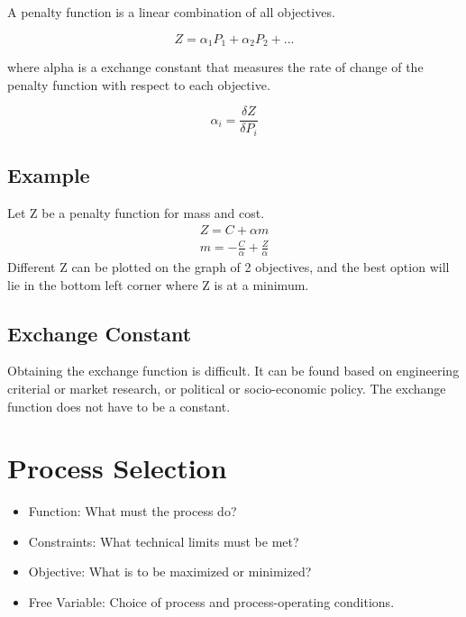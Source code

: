 \documentclass{article}
\begin{document}
        A penalty function is a linear combination of all objectives.

        \begin{equation*}
            Z = \alpha_{1} P_{1} + \alpha_{2} P_{2}+...
        \end{equation*}

        where alpha is a exchange constant that measures the rate of change of the 
        penalty function with respect to each objective.

        \begin{equation*}
            \alpha_{i} = \frac{\delta Z}{\delta P_{i}}
        \end{equation*}

        \subsection*{Example}
        Let Z be a penalty function for mass and cost.
            \begin{align*}
                Z = C + \alpha m\\
                m = -\frac{C}{\alpha} + \frac{Z}{\alpha}
            \end{align*}
        Different Z can be plotted on the graph of 2 objectives, and the best option will lie in the 
        bottom left corner where Z is at a minimum.

        \subsection*{Exchange Constant}
        Obtaining the exchange function is difficult. It can be found based on engineering criterial or 
        market research, or political or socio-economic policy. The exchange function does not have to be a constant.

        \section*{Process Selection}
        \begin{itemize}
           \item Function: What must the process do?
           \item Constraints: What technical limits must be met?
           \item Objective: What is to be maximized or minimized?
           \item Free Variable: Choice of process and process-operating conditions. 
        \end{itemize}
\end{document}
